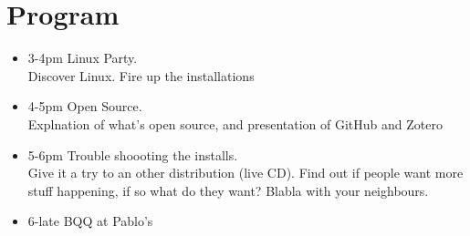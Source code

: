 \documentclass[a4paper]{article}
\begin{document}
\section{Program}
\begin{itemize}
\item 3-4pm Linux Party.\\
Discover Linux. Fire up the installations
\item 4-5pm Open Source.\\
Explnation of what's open source, and presentation of GitHub and Zotero
\item 5-6pm Trouble shoooting the installs.\\
Give it a try to an other distribution (live CD). Find out if people want more stuff happening, if so what do they want? Blabla with your neighbours.
\item 6-late BQQ at Pablo's
\end{itemize}
\end{document}
